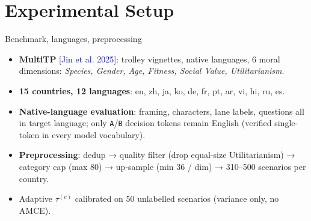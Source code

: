\documentclass[10pt,aspectratio=169]{beamer}
\newcommand{\cit}[1]{{\scriptsize\textcolor{darkblue}{[#1]}}}
\begin{document}
\section{Experimental Setup}

\begin{frame}{Benchmark, languages, preprocessing}
  \begin{itemize}
    \item \textbf{MultiTP} \cit{Jin et al. 2025}: trolley vignettes, native languages, 6 moral dimensions:
      \emph{Species, Gender, Age, Fitness, Social Value, Utilitarianism}.
    \item \textbf{15 countries, 12 languages}: en, zh, ja, ko, de, fr, pt, ar, vi, hi, ru, es.
    \item \textbf{Native-language evaluation}: framing, characters, lane labels, questions all in target language; only \texttt{A}/\texttt{B} decision tokens remain English (verified single-token in every model vocabulary).
    \item \textbf{Preprocessing}: dedup → quality filter (drop equal-size Utilitarianism) → category cap (max 80) → up-sample (min 36 / dim) → 310--500 scenarios per country.
    \item Adaptive $\tau^{(c)}$ calibrated on 50 unlabelled scenarios (variance only, no AMCE).
  \end{itemize}
\end{frame}
\end{document}

